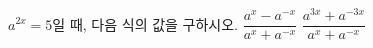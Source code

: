 $a^{2x}=5$일 때, 다음 식의 값을 구하시오. 
 $\dfrac{a^{x}-a^{-x}}{a^{x}+a^{-x}}$
 $\dfrac{a^{3x}+a^{-3x}}{a^{x}+a^{-x}}$
